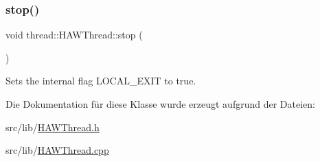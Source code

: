 \subsubsection{\texorpdfstring{stop()}{stop()}}
{\footnotesize\ttfamily void thread\+::\+H\+A\+W\+Thread\+::stop (\begin{DoxyParamCaption}{ }\end{DoxyParamCaption})}

Sets the internal flag L\+O\+C\+A\+L\+\_\+\+E\+X\+IT to true. 

Die Dokumentation für diese Klasse wurde erzeugt aufgrund der Dateien\+:\begin{DoxyCompactItemize}
\item 
src/lib/\hyperlink{_h_a_w_thread_8h}{H\+A\+W\+Thread.\+h}\item 
src/lib/\hyperlink{_h_a_w_thread_8cpp}{H\+A\+W\+Thread.\+cpp}\end{DoxyCompactItemize}
